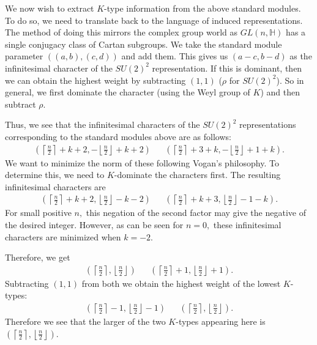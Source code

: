 \documentclass[letterpaper,twosided,11pt]{article}
\theoremstyle{plain}
\theoremstyle{definition}
\theoremstyle{remark}
\newcommand{\HH}{\mathbb{H}}
\begin{document}
We now wish to extract $ K $-type information from the above standard
modules.  To do so, we need to translate back to the language of induced
representations.  The method of doing this mirrors the complex group
world as $ GL(n,\HH) $ has a single conjugacy class of Cartan subgroups.
We take the standard module parameter $ ((a,b),(c,d)) $ and add them.
This gives us $ (a-c,b-d) $ as the infinitesimal character of the $ SU(2)^2
$ representation.  If this is dominant, then we can obtain the highest
weight by subtracting $ (1,1) $ ($ \rho $ for $ SU(2)^2 $).  So in
general, we first dominate the character (using the Weyl group of $ K $)
and then subtract $ \rho. $

Thus, we see that the infinitesimal characters of the $ SU(2)^2 $
representations corresponding to the standard modules above are as
follows:
\begin{align*}
    \left(\left\lceil \frac{n}{2} \right \rceil +k+2,-\left\lfloor \frac
    {n}{2} \right \rfloor +k+2 \right)&& \left(\left\lceil \frac{n}{2}
    \right \rceil +3+k,-\left\lfloor \frac{n}{2} \right \rfloor+1+k
    \right).
\end{align*}
We want to minimize the norm of these following Vogan's philosophy.  To
determine this, we need to $ K $-dominate the characters first.  The
resulting infinitesimal characters are
\begin{align*}
    \left(\left\lceil \frac{n}{2} \right \rceil +k+2 ,\left\lfloor \frac
    {n}{2} \right \rfloor -k-2 \right)&& \left(\left\lceil \frac{n}{2}
    \right \rceil+k +3,\left\lfloor \frac{n}{2} \right \rfloor-1-k
    \right).
\end{align*}
For small positive $ n, $ this negation of the second factor may give
the negative of the desired integer.  However, as can be seen for $ n=0,
$ these infinitesimal characters are minimized when $ k=-2. $

Therefore, we get
\begin{align*}
    \left(\left\lceil \frac{n}{2} \right \rceil ,\left\lfloor \frac{n}{2}
    \right \rfloor \right)&& \left(\left\lceil \frac{n}{2} \right \rceil
    +1,\left\lfloor \frac{n}{2} \right \rfloor+1 \right).
\end{align*}
Subtracting $ (1,1) $ from both we obtain the highest weight of the
lowest $ K $-types:
\begin{align*}
    \left(\left\lceil \frac{n}{2} \right \rceil-1 ,\left\lfloor \frac{n}
    {2} \right \rfloor-1 \right)&& \left(\left\lceil \frac{n}{2} \right
    \rceil ,\left\lfloor \frac{n}{2} \right \rfloor \right).
\end{align*}
Therefore we see that the larger of the two $ K $-types appearing here
is $ \left(\left\lceil \frac{n}{2} \right \rceil ,\left\lfloor \frac{n}{2}
\right \rfloor \right). $
\end{document}
